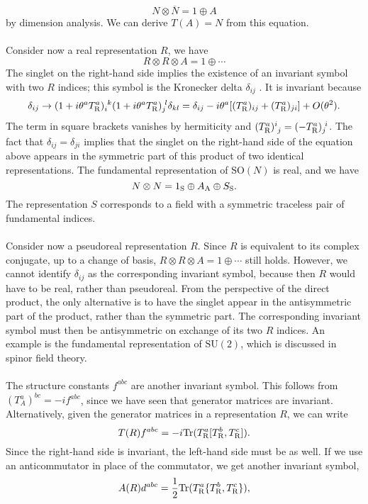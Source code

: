 \[N \otimes \overline{N} = 1 \oplus A \]
by dimension analysis. We can derive $T(A) = N$ from this equation.
\\ \\
Consider now a real representation $R$, we have
\[R \otimes R \otimes A = 1 \oplus \cdots\]
The singlet on the right-hand side implies the existence of an invariant symbol with two $R$ indices; this symbol is the Kronecker delta $\delta_{ij}$ . It is invariant because
\[\delta_{ij} \to (1+i\theta^a T^a_{\rm R})_{i}^{\phantom{i}k} (1+i\theta^a T^a_{\rm R})_{j}^{\phantom{i}l}\delta_{kl} = \delta_{ij} - i\theta^a [(T^a_{\rm R})_{ij} + (T^a_{\rm R})_{ji}] + O(\theta^2).\]
The term in square brackets vanishes by hermiticity and $(T^{a}_{\rm R})^{i}_{\phantom{i}j} = (-T^{a}_{\rm R})_{j}^{\phantom{i}i}$. 
The fact that $\delta_{ij} = \delta_{ji}$ implies that the singlet on the right-hand side of the equation above appears in the symmetric part of this product of two identical representations.
The fundamental representation of $\mathrm{SO}(N)$ is real, and we have
\[N \otimes N = 1_{\rm S} \oplus A_{\rm A} \oplus S_{\rm S}.\]
The representation $S$ corresponds to a field with a symmetric traceless pair of fundamental indices.
\\ \\
Consider now a pseudoreal representation $R$. Since $R$ is equivalent to its complex conjugate, up to a change of basis, $R \otimes R \otimes A = 1 \oplus \cdots$  still holds. However, we cannot identify $\delta_{ij}$ as the corresponding invariant symbol, because then $R$ would have to be real, rather than pseudoreal. 
From the perspective of the direct product, the only alternative is to have the singlet appear in the antisymmetric part of the product, rather than the symmetric part. The corresponding invariant symbol must then be antisymmetric on exchange of its two $R$ indices.
An example is the fundamental representation of $\mathrm{SU}(2)$, which is discussed in spinor field theory.
\\ \\
The structure constants $f^{abc}$ are another invariant symbol. This follows from $(T^a_A)^{bc} = -if^{abc}$, since we have seen that generator matrices are invariant.
Alternatively, given the generator matrices in a representation $R$, we can write
\[T(R)f^{abc} = -i \mathrm{Tr}(T^a_{\rm R}[T^b_{\rm R},T^c_{\rm R}]).\]
Since the right-hand side is invariant, the left-hand side must be as well.
If we use an anticommutator in place of the commutator, we get another invariant symbol,
\[A(R)d^{abc} = \frac{1}{2} \mathrm{Tr}(T^a_{\rm R}\{T^b_{\rm R},T^c_{\rm R}\}),\]
